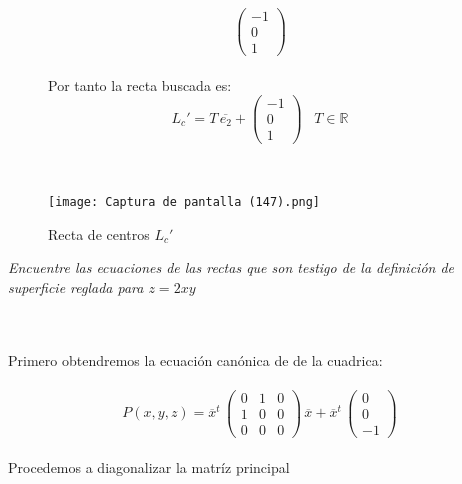 \documentclass[11pt,letterpaper]{article}
\newcommand{\R}{\mathbb{R}}
\begin{document}
\begin{figure}
\begin{equation*}
\begin{pmatrix}
                -1 \\
                0\\
                1
                \end{pmatrix}
    \end{equation*}\,\\
    Por tanto la recta buscada es:\,\\
    \begin{equation*}
        L_{c}'=T\,\overline{e_2}+\begin{pmatrix}
                -1 \\
                0\\
                1
                \end{pmatrix}\,\,\,\,\,T\in \R
    \end{equation*}
\end{figure}
\newpage\,\\
\begin{figure}
    \centering
    \texttt{[image: Captura de pantalla (147).png]}
    \caption{Recta de centros $L_{c}'$}
    \label{Cono rebanado}
    \newpage
     \end{figure}
     \newpage
    \begin{tcolorbox}[
	title = \textcolor{black}{\textcolor{white}{Problema 3}},]
\textit{Encuentre las ecuaciones de las rectas que son testigo de la definici\'on de superficie reglada
para $z=2xy$
}
\end{tcolorbox}\,\\
\,\\
Primero obtendremos la ecuaci\'on can\'onica de de la cuadrica:\,\\
\,\\
\begin{equation*}
        P(x,y,z)=\overline{x}^t\,\begin{pmatrix}
                0 & 1 & 0\\
                1& 0 & 0\\
                0 & 0 & 0
                \end{pmatrix}\,\overline{x}+\overline{x}^t\,
                \begin{pmatrix}
                0 \\
                0\\
                -1
                \end{pmatrix}
    \end{equation*}\,\\
     Procedemos a diagonalizar la matr\'iz principal\,\\
\end{document}
